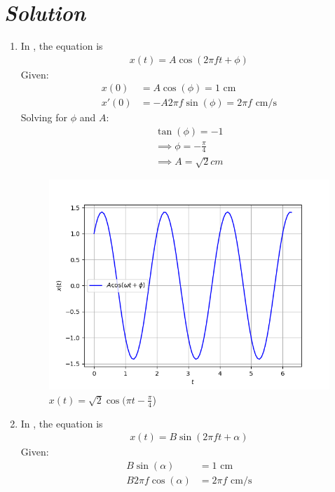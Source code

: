 \documentclass[journal,12pt,twocolumn]{IEEEtran}
\theoremstyle{remark}
\begin{document}
\section*{\textit{\textbf{Solution}}}

\begin{enumerate}
\item In , the equation is
\begin{align}
   x(t) = A \cos(2\pi f t + \phi)  
\end{align}
Given:
\begin{align}
     x(0)&= A \cos(\phi) = 1 \text{ cm} \\
 x'(0)&= -A 2\pi f \sin(\phi) = 2\pi f \text{ cm/s} \label{eq:3}
 \end{align}
Solving for $\phi$ and $A$:
\begin{align}
    \tan(\phi) = -1\\
\implies
\phi = -\frac{\pi}{4} \\
\implies 
A= \sqrt{2}cm
\end{align}
\begin{figure}[h]
\renewcommand\thefigure{1}
    \centering
    \includegraphics[width=0.8\columnwidth]{figs/fig1.png}
    \caption{$x(t) = \sqrt{2}\cos(\pi t - \frac{\pi}{4}$)}
    \label{Fig1_11.14.7}
\end{figure}
    \item In , the equation is
\begin{align}
    x(t) = B \sin(2\pi f t + \alpha) 
    \end{align}
    Given:\\
    \begin{align}
     B \sin(\alpha) &= 1 \text{ cm} \\
    B 2\pi f \cos(\alpha) &= 2\pi f \text{ cm/s}\label{eq;11}

\end{align}
\end{enumerate}
\end{document}
